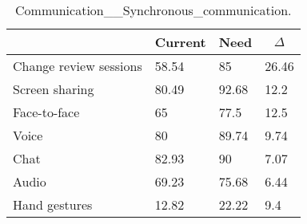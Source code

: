 
  \begin{table*}[]
  \centering
  \notsotiny
  \caption{ Communication__Synchronous_communication.}
\label{tab:communication__synchronous_communication}
\begin{tabular}{|l|l|l|l|}
  \hline
  \rowcolor[HTML]{C0C0C0}
    \multicolumn{1}{|c|}{Feature} & \multicolumn{1}{c|}{Current} & \multicolumn{1}{c|}{Need} & \multicolumn{1}{c|}{$\Delta$} \\ \hline
  Change review sessions & 58.54 & 85 & 26.46 \\ \hline 
Screen sharing & 80.49 & 92.68 & 12.2 \\ \hline 
Face-to-face & 65 & 77.5 & 12.5 \\ \hline 
Voice & 80 & 89.74 & 9.74 \\ \hline 
Chat & 82.93 & 90 & 7.07 \\ \hline 
Audio & 69.23 & 75.68 & 6.44 \\ \hline 
Hand gestures & 12.82 & 22.22 & 9.4 \\ \hline 
\end{tabular}%
  \end{table*}